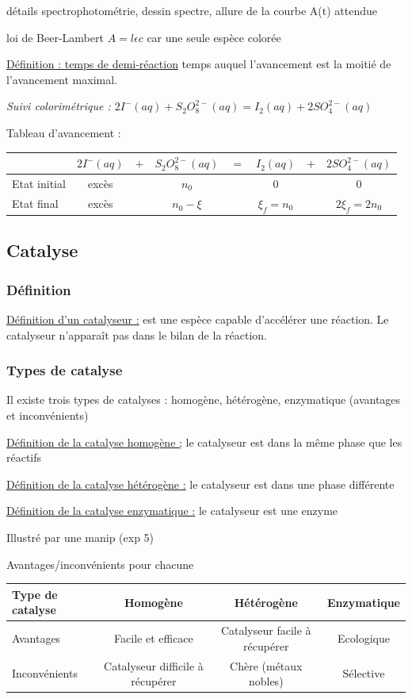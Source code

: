 \documentclass{article}%
\begin{document}
détails spectrophotométrie, dessin spectre, allure de la courbe A(t) attendue

loi de Beer-Lambert $A=l \epsilon c$ car une seule espèce colorée

\underline{Définition : temps de demi-réaction} temps auquel l’avancement est la moitié de l’avancement maximal.

\textit{Suivi colorimétrique : $2 I^-(aq) +S_2O_8^{2-}(aq)=I_2(aq)+2 SO_4^{2-}(aq)$}

Tableau d'avancement :

\begin{tabular}{l|ccccccc}
&$2 I^-(aq)$&$+$&$S_2O_8^{2-}(aq)$&$=$&$I_2(aq)$&$+$&$2 SO_4^{2-}(aq)$\\
\hline
Etat initial &excès && $n_0$ && $0$ && $0$\\
Etat final &excès && $n_0 - \xi$ && $\xi_f=n_0$ && $2 \xi_f=2 n_0$\\
\hline
\end{tabular}
\subsection{Catalyse}
\subsubsection{Définition}

\underline{Définition d'un catalyseur :} est une espèce capable d’accélérer une réaction. Le catalyseur n’apparaît pas dans le bilan de la réaction.

\subsubsection{Types de catalyse}

Il existe trois types de catalyses : homogène, hétérogène, enzymatique (avantages et inconvénients)

\underline{Définition de la catalyse homogène ;} le catalyseur est dans la même phase que les réactifs

\underline{Définition de la catalyse hétérogène :} le catalyseur est dans une phase différente

\underline{Définition de la catalyse enzymatique :} le catalyseur est une enzyme

Illustré par une manip (exp 5)

Avantages/inconvénients pour chacune

\begin{tabular}{l|ccc}
Type de catalyse &Homogène &Hétérogène &Enzymatique \\
\hline
Avantages &Facile et efficace &Catalyseur facile à récupérer &Ecologique \\
Inconvénients &Catalyseur difficile à récupérer &Chère (métaux nobles) &Sélective\\
\hline
\end{tabular}
\end{document}
